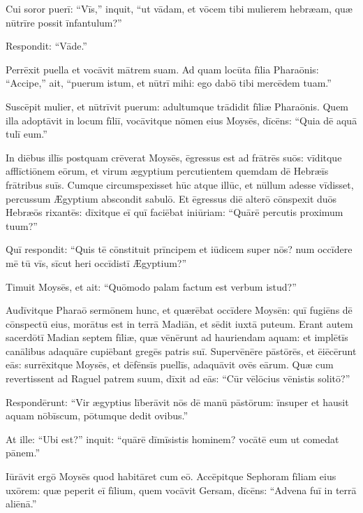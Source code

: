 Cui soror puerī: ``Vīs,'' inquit, ``ut vādam, et vōcem tibi mulierem hebræam,
quæ nūtrīre possit īnfantulum?''

Respondit: ``Vāde.''

Perrēxit puella et vocāvit mātrem suam.
Ad quam locūta fīlia Pharaōnis: ``Accipe,'' ait, ``puerum istum, et nūtrī mihi: ego dabō tibi mercēdem tuam.''

Suscēpit mulier, et nūtrīvit puerum: adultumque trādidit fīliæ Pharaōnis. 
Quem illa adoptāvit in locum fīliī,
vocāvitque nōmen eius Moysēs, dīcēns: ``Quia dē aquā tulī eum.''

In diēbus illīs postquam crēverat Moysēs, ēgressus est ad frātrēs suōs:
vīditque afflīctiōnem eōrum, et virum ægyptium percutientem quemdam dē Hebræīs frātribus suīs.
Cumque circumspexisset hūc atque illūc,
et nūllum adesse vīdisset,
percussum Ægyptium abscondit sabulō.
Et ēgressus diē alterō cōnspexit duōs Hebræōs rixantēs:
dīxitque eī quī faciēbat iniūriam: ``Quārē percutis proximum tuum?''

Quī respondit: ``Quis tē cōnstituit prīncipem et iūdicem super nōs?
num occīdere mē tū vīs, sīcut heri occīdistī Ægyptium?''

Timuit Moysēs, et ait: ``Quōmodo palam factum est verbum istud?''

Audīvitque Pharaō sermōnem hunc, et quærēbat occīdere Moysēn:
quī fugiēns dē cōnspectū eius, morātus est in terrā Madiān,
et sēdit iuxtā puteum.
Erant autem sacerdōtī Madian septem fīliæ,
quæ vēnērunt ad hauriendam aquam:
et implētīs canālibus adaquāre cupiēbant gregēs patris suī.
Supervēnēre pāstōrēs, et ēiēcērunt eās:
surrēxitque Moysēs, et dēfēnsīs puellīs, adaquāvit ovēs eārum. 
Quæ cum revertissent ad Raguel patrem suum, dīxit ad eās:
``Cūr vēlōcius vēnistis solitō?''

Respondērunt: ``Vir ægyptius līberāvit nōs dē manū pāstōrum:
īnsuper et hausit aquam nōbīscum, pōtumque dedit ovibus.''

At ille: ``Ubi est?'' inquit: ``quārē dīmīsistis hominem? vocātē eum ut comedat pānem.''

Iūrāvit ergō Moysēs quod habitāret cum eō.
Accēpitque Sephoram fīliam eius uxōrem:
quæ peperit eī fīlium, quem vocāvit Gersam, dīcēns:
``Advena fuī in terrā aliēnā.''

